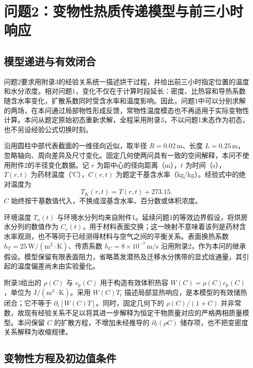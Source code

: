 \section{问题2：变物性热质传递模型与前三小时响应}
\label{sec:q2}


\subsection{模型递进与有效闭合}

问题2要求用附录3的经验关系统一描述烘干过程，并给出前三小时指定位置的温度和水分浓度。相对问题1，变化不仅在于计算时段延长：密度、比热容和导热系数随含水率变化，扩散系数同时受含水率和温度影响。因此，问题1中可以分别求解的两场，在本问通过局部物性形成反馈，常物性温度模态也不再适用于实际变物性计算。本问从题定原始初态重新求解，全程采用附录3，不以问题1末态作为初态，也不另设经验公式切换时刻。

沿用圆柱中部代表截面的一维径向近似，取半径 \(R=0.02\,\mathrm m\)、长度 \(L=0.25\,\mathrm m\)，忽略轴向、周向差异及尺寸变化。固定几何使两问具有一致的空间解释，本问不使用附件2的半径变化数据。记 \(r\) 为距中心的径向距离（m），\(t\) 为时间（s），\(T(r,t)\) 为药材温度（℃），\(C(r,t)\) 为题定干基含水率（kg/kg）。经验式中的绝对温度为
\begin{equation}
T_K(r,t)=T(r,t)+273.15 .
\label{eq:q2-kelvin}
\end{equation}
\(C\) 始终按干基数值代入，不换成湿基含水率、百分数或体积浓度。

环境温度 \(T_a(t)\) 与环境水分列均来自附件1。延续问题1的等效边界假设，将烘房水分列的数值作为 \(C_e(t)\)，用于材料表面交换；这一映射不意味着该列是药材含水率观测，也不等同于已经测得材料与空气之间的平衡关系。表面换热系数 \(h_T=25\,\mathrm{W/(m^2\cdot K)}\)、传质系数 \(h_C=8\times10^{-7}\,\mathrm{m/s}\) 沿用附录2，作为本问的继承假设。模型保留有限表面阻力，省略蒸发潜热及迁移水分携带的显式焓通量，其引起的温度偏差尚未由实验量化。

附录3给出的 \(\rho(C)\) 与 \(c_p(C)\) 用于构造有效体积热容 \(W(C)=\rho(C)c_p(C)\)，单位为 \(\mathrm{J/(m^3\cdot K)}\)。采用 \(W(C)T_t\) 描述局部显热响应，是本模型的有效储热闭合；它不等于 \(\partial_t[W(C)T]\)。同时，固定几何下的 \(\rho(C)/(1+C)\) 并非常数，故现有经验关系不足以将其进一步解释为恒定干物质量对应的严格两相质量模型。本问保留 \(C\) 的扩散方程，不增加未经推导的 \(\partial_t(\rho C)\) 储存项，也不把变密度关系解释为收缩规律。

\subsection{变物性方程及初边值条件}

